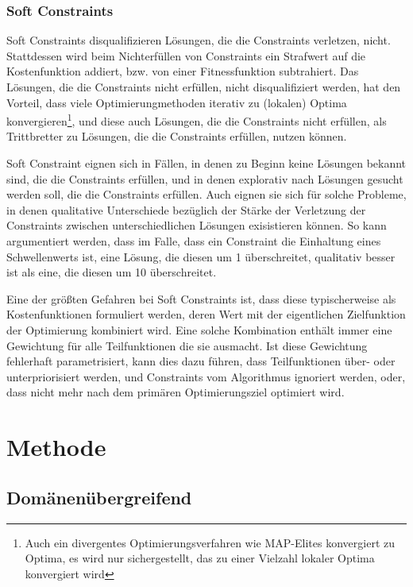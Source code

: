 \subsubsection{Soft Constraints}
Soft Constraints disqualifizieren Lösungen, die die Constraints verletzen, nicht.
Stattdessen wird beim Nichterfüllen von Constraints ein Strafwert auf die Kostenfunktion addiert, bzw. von einer Fitnessfunktion subtrahiert.
Das Lösungen, die die Constraints nicht erfüllen, nicht disqualifiziert werden, hat den Vorteil, dass viele Optimierungmethoden iterativ zu (lokalen) Optima konvergieren\footnote{Auch ein divergentes Optimierungsverfahren wie MAP-Elites konvergiert zu Optima, es wird nur sichergestellt, das zu einer Vielzahl lokaler Optima konvergiert wird}, 
und diese auch Lösungen, die die Constraints nicht erfüllen, als Trittbretter zu Lösungen, die die Constraints erfüllen, nutzen können.

Soft Constraint eignen sich in Fällen, in denen zu Beginn keine Lösungen bekannt sind, die die Constraints erfüllen, und in denen explorativ nach Lösungen gesucht werden soll, die die Constraints erfüllen.
Auch eignen sie sich für solche Probleme, in denen qualitative Unterschiede bezüglich der Stärke der Verletzung der Constraints zwischen unterschiedlichen Lösungen exisistieren können.
So kann argumentiert werden, dass im Falle, dass ein Constraint die Einhaltung eines Schwellenwerts ist, eine Lösung, die diesen um 1 überschreitet, qualitativ besser ist als eine, die diesen um 10 überschreitet.

Eine der größten Gefahren bei Soft Constraints ist, dass diese typischerweise als Kostenfunktionen formuliert werden, deren Wert mit der eigentlichen Zielfunktion der Optimierung kombiniert wird.
Eine solche Kombination enthält immer eine Gewichtung für alle Teilfunktionen die sie ausmacht.
Ist diese Gewichtung fehlerhaft parametrisiert, kann dies dazu führen, dass Teilfunktionen über- oder unterpriorisiert werden, und Constraints vom Algorithmus ignoriert werden, oder, dass nicht mehr nach dem primären Optimierungsziel optimiert wird.


\newpage

\section{Methode}

\subsection{Domänenübergreifend}

